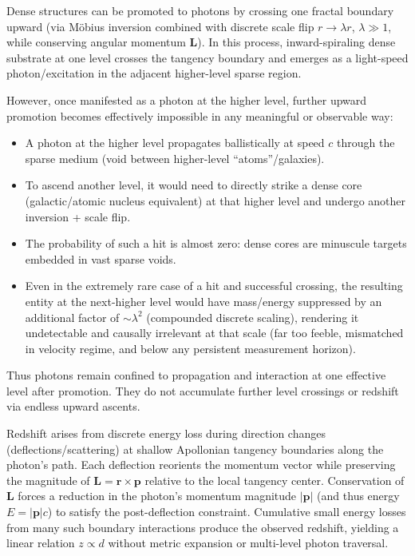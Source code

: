 \documentclass[11pt,a4paper]{article}
\begin{document}
Dense structures can be promoted to photons by crossing one fractal boundary upward (via M\"obius inversion combined with discrete scale flip $r \to \lambda r$, $\lambda \gg 1$, while conserving angular momentum $\mathbf{L}$). In this process, inward-spiraling dense substrate at one level crosses the tangency boundary and emerges as a light-speed photon/excitation in the adjacent higher-level sparse region.

However, once manifested as a photon at the higher level, further upward promotion becomes effectively impossible in any meaningful or observable way:
\begin{itemize}
\item A photon at the higher level propagates ballistically at speed $c$ through the sparse medium (void between higher-level ``atoms''/galaxies).
\item To ascend another level, it would need to directly strike a dense core (galactic/atomic nucleus equivalent) at that higher level and undergo another inversion + scale flip.
\item The probability of such a hit is almost zero: dense cores are minuscule targets embedded in vast sparse voids.
\item Even in the extremely rare case of a hit and successful crossing, the resulting entity at the next-higher level would have mass/energy suppressed by an additional factor of $\sim \lambda^2$ (compounded discrete scaling), rendering it undetectable and causally irrelevant at that scale (far too feeble, mismatched in velocity regime, and below any persistent measurement horizon).
\end{itemize}

Thus photons remain confined to propagation and interaction at one effective level after promotion. They do not accumulate further level crossings or redshift via endless upward ascents.

Redshift arises from discrete energy loss during direction changes (deflections/scattering) at shallow Apollonian tangency boundaries along the photon's path. Each deflection reorients the momentum vector while preserving the magnitude of $\mathbf{L} = \mathbf{r} \times \mathbf{p}$ relative to the local tangency center. Conservation of $\mathbf{L}$ forces a reduction in the photon's momentum magnitude $|\mathbf{p}|$ (and thus energy $E = |\mathbf{p}| c$) to satisfy the post-deflection constraint. Cumulative small energy losses from many such boundary interactions produce the observed redshift, yielding a linear relation $z \propto d$ without metric expansion or multi-level photon traversal.
\end{document}

